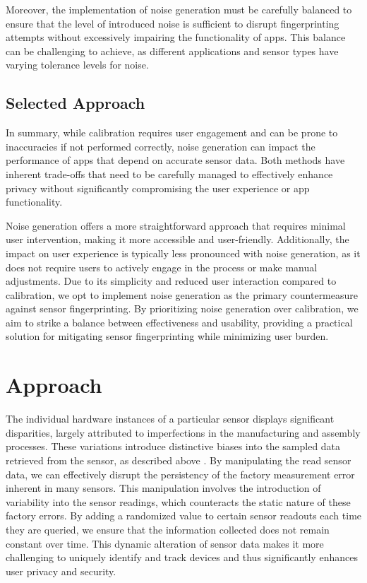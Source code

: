 \documentclass[11pt,
  oneside,openany,    %
]{scrreprt}
\begin{document}
Moreover, the implementation of noise generation must be carefully balanced to ensure that the level of introduced noise is sufficient to disrupt fingerprinting attempts without excessively impairing the functionality of apps. 
This balance can be challenging to achieve, as different applications and sensor types have varying tolerance levels for noise.

\section{Selected Approach}
\label{sec:approach}
In summary, while calibration requires user engagement and can be prone to inaccuracies if not performed correctly, noise generation can impact the performance of apps that depend on accurate sensor data. 
Both methods have inherent trade-offs that need to be carefully managed to effectively enhance privacy without significantly compromising the user experience or app functionality.

Noise generation offers a more straightforward approach that requires minimal user intervention, making it more accessible and user-friendly.
Additionally, the impact on user experience is typically less pronounced with noise generation, as it does not require users to actively engage in the process or make manual adjustments. 
Due to its simplicity and reduced user interaction compared to calibration, we opt to implement noise generation as the primary countermeasure against sensor fingerprinting. 
By prioritizing noise generation over calibration, we aim to strike a balance between effectiveness and usability, providing a practical solution for mitigating sensor fingerprinting while minimizing user burden.

\chapter{Approach}
\label{chap:approach}
The individual hardware instances of a particular sensor displays significant disparities, largely attributed to imperfections in the manufacturing and assembly processes. 
These variations introduce distinctive biases into the sampled data retrieved from the sensor, as described above \cite{DBLP:conf/sp/ZhangBS19, DBLP:conf/ndss/DeyRXCN14, das2014poster}. 
By manipulating the read sensor data, we can effectively disrupt the persistency of the factory measurement error inherent in many sensors.
This manipulation involves the introduction of variability into the sensor readings, which counteracts the static nature of these factory errors.
By adding a randomized value to certain sensor readouts each time they are queried, we ensure that the information collected does not remain constant over time.
This dynamic alteration of sensor data makes it more challenging to uniquely identify and track devices and thus significantly enhances user privacy and security.
\end{document}
